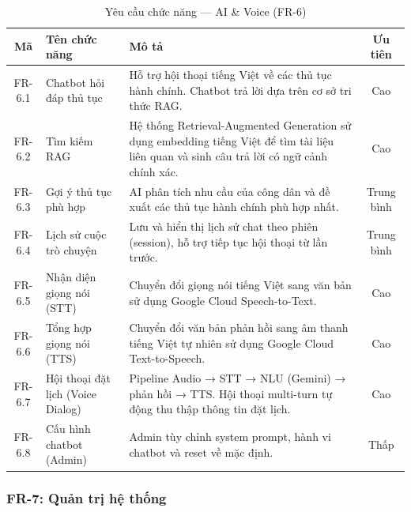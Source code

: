 \begin{table}[H]
\centering
\caption{Yêu cầu chức năng — AI \& Voice (FR-6)}
\label{tab:fr-ai}
\begin{tabularx}{\textwidth}{|c|l|X|c|}
\hline
\textbf{Mã} & \textbf{Tên chức năng} & \textbf{Mô tả} & \textbf{Ưu tiên} \\
\hline
FR-6.1 & Chatbot hỏi đáp thủ tục &
  Hỗ trợ hội thoại tiếng Việt về các thủ tục hành chính.
  Chatbot trả lời dựa trên cơ sở tri thức RAG. &
  Cao \\
\hline
FR-6.2 & Tìm kiếm RAG &
  Hệ thống Retrieval-Augmented Generation sử dụng embedding tiếng Việt
  để tìm tài liệu liên quan và sinh câu trả lời có ngữ cảnh chính xác. &
  Cao \\
\hline
FR-6.3 & Gợi ý thủ tục phù hợp &
  AI phân tích nhu cầu của công dân và đề xuất các thủ tục hành chính
  phù hợp nhất. &
  Trung bình \\
\hline
FR-6.4 & Lịch sử cuộc trò chuyện &
  Lưu và hiển thị lịch sử chat theo phiên (session), hỗ trợ tiếp tục
  hội thoại từ lần trước. &
  Trung bình \\
\hline
FR-6.5 & Nhận diện giọng nói (STT) &
  Chuyển đổi giọng nói tiếng Việt sang văn bản sử dụng Google
  Cloud Speech-to-Text. &
  Cao \\
\hline
FR-6.6 & Tổng hợp giọng nói (TTS) &
  Chuyển đổi văn bản phản hồi sang âm thanh tiếng Việt tự nhiên
  sử dụng Google Cloud Text-to-Speech. &
  Cao \\
\hline
FR-6.7 & Hội thoại đặt lịch (Voice Dialog) &
  Pipeline Audio → STT → NLU (Gemini) → phản hồi → TTS.
  Hội thoại multi-turn tự động thu thập thông tin đặt lịch. &
  Cao \\
\hline
FR-6.8 & Cấu hình chatbot (Admin) &
  Admin tùy chỉnh system prompt, hành vi chatbot và reset về mặc định. &
  Thấp \\
\hline
\end{tabularx}
\end{table}

\subsubsection{FR-7: Quản trị hệ thống}

